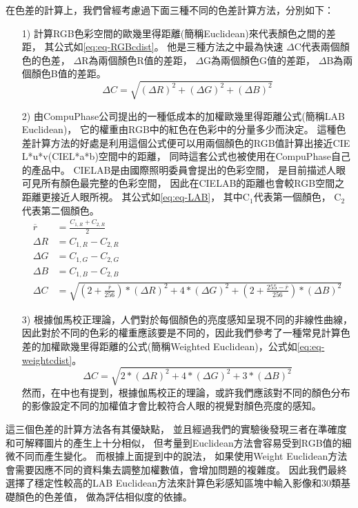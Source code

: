 \documentclass[class=NCU_thesis, crop=false]{standalone}
\begin{document}
	在色差的計算上，我們曾經考慮過下面三種不同的色差計算方法，分別如下：
	\begin{itemize}
	  \item [1)] 
	  	計算RGB色彩空間的歐幾里得距離(簡稱Euclidean)來代表顏色之間的差距，
	  	其公式如\cref{eq:eq-RGBcdist}。
	  	他是三種方法之中最為快速
	  	$\Delta$C代表兩個顏色的色差，
	  	$\Delta$R為兩個顏色R值的差距，
	  	$\Delta$G為兩個顏色G值的差距，
	  	$\Delta$B為兩個顏色B值的差距。
	  	\begin{equation}
	    \label{eq:eq-RGBcdist}
	    	\Delta C = \sqrt{(\Delta R)^2 + (\Delta G)^2 + (\Delta B)^2}
		\end{equation}

	  \item [2)]
	  	由CompuPhase公司提出的一種低成本的加權歐幾里得距離公式\cite{LABformula}(簡稱LAB Euclidean)，
	  	它的權重由RGB中的紅色在色彩中的分量多少而決定。
	  	這種色差計算方法的好處是利用這個公式便可以用兩個顏色的RGB值計算出接近CIE L*u*v(CIEL*a*b)空間中的距離，
	  	同時這套公式也被使用在CompuPhase自己的產品中。
	  	CIELAB是由國際照明委員會提出的色彩空間，
	  	是目前描述人眼可見所有顏色最完整的色彩空間，
	  	因此在CIELAB的距離也會較RGB空間之距離更接近人眼所視。
	  	其公式如\cref{eq:eq-LAB}，
	  	其中C$_{1}$代表第一個顏色，
	  	C$_{2}$代表第二個顏色。
	  	\begin{equation}
	    \label{eq:eq-LAB}
	    \begin{split}
	    	\overline{r} & = \frac{C_{1,R} + C_{2,R}}{2} \\
	    	\Delta R & = C_{1,R} - C_{2,R} \\
	    	\Delta G & = C_{1,G} - C_{2,G} \\
	    	\Delta B & = C_{1,B} - C_{2,B} \\
	    	\Delta C & = \sqrt{(2 + \frac{\overline{r}}{256}) * (\Delta R)^2 + 4 * (\Delta G)^2 + (2 + \frac{255 - \overline{r}}{256}) * (\Delta B)^2}
	    \end{split}
		\end{equation}

	  \item [3)]
	  	根據伽馬校正理論，人們對於每個顏色的亮度感知呈現不同的非線性曲線，因此對於不同的色彩的權重應該要是不同的，因此我們參考了一種常見計算色差的加權歐幾里得距離的公式(簡稱Weighted Euclidean)，公式如\cref{eq:eq-weightcdist}。
	  	\begin{equation}
	    \label{eq:eq-weightcdist}
	    	\Delta C = \sqrt{2 * (\Delta R)^2 + 4 * (\Delta G)^2 + 3 * (\Delta B)^2}
		\end{equation}
		然而，在\cite{LABformula}中也有提到，根據伽馬校正的理論，或許我們應該對不同的顏色分布的影像設定不同的加權值才會比較符合人眼的視覺對顏色亮度的感知。
	\end{itemize}
	這三個色差的計算方法各有其優缺點，
	並且經過我們的實驗後發現三者在準確度和可解釋圖片的產生上十分相似，
	但考量到Euclidean方法會容易受到RGB值的細微不同而產生變化。
	而根據上面提到\cite{LABformula}中的說法，
	如果使用Weight Euclidean方法會需要因應不同的資料集去調整加權數值，會增加問題的複雜度。
	因此我們最終選擇了穩定性較高的LAB Euclidean方法來計算色彩感知區塊中輸入影像和30類基礎顏色的色差值，
	做為評估相似度的依據。
\end{document}
